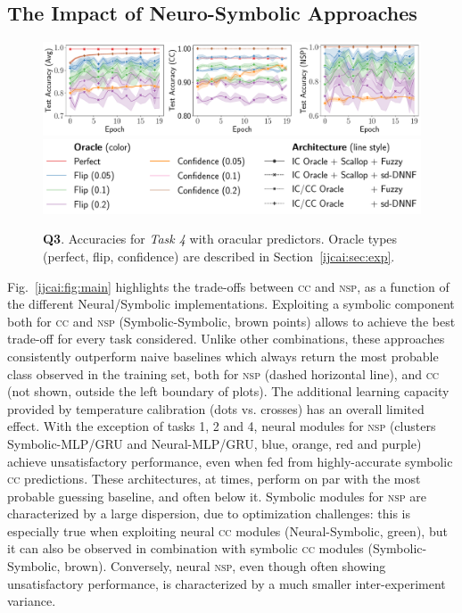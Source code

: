 \subsection{The Impact of Neuro-Symbolic Approaches}
\begin{figure}
\centering
\includegraphics[width=\linewidth]{imgs/ijcai/ablation_task4.pdf}\\
{\includegraphics[width=\linewidth]{imgs/ijcai/ablation_task4_legend.pdf}}
\caption[Oracle experiments on LTLZinc-Short (rejection sampling) Task 4]{\textbf{Q3}. Accuracies for \textit{Task 4} with oracular predictors. Oracle types (perfect, flip, confidence) are described in Section~\ref{ijcai:sec:exp}.}
\label{ijcai:fig:abl-task4}
\end{figure}
%
Fig.~\ref{ijcai:fig:main} highlights the trade-offs between \textsc{cc} and \textsc{nsp}, as a function of the different Neural/Symbolic implementations.
%
Exploiting a symbolic component both for \textsc{cc} and \textsc{nsp} (Symbolic-Symbolic, brown points) allows to achieve the best trade-off for every task considered. Unlike other combinations, these approaches consistently outperform naive baselines which always return the most probable class observed in the training set, both for \textsc{nsp} (dashed horizontal line), and \textsc{cc} (not shown, outside the left boundary of plots).
%
The additional learning capacity provided by temperature calibration (dots vs. crosses) has an overall limited effect.
%
With the exception of tasks 1, 2 and 4, neural modules for \textsc{nsp} (clusters Symbolic-MLP/GRU and Neural-MLP/GRU, blue, orange, red and purple) achieve unsatisfactory performance, even when fed from highly-accurate symbolic \textsc{cc} predictions. These architectures, at times, perform on par with the most probable guessing baseline, and often below it.
%
Symbolic modules for \textsc{nsp} are characterized by a large dispersion, due to optimization challenges: this is especially true when exploiting neural \textsc{cc} modules (Neural-Symbolic, green), but it can also be observed in combination with symbolic \textsc{cc} modules (Symbolic-Symbolic, brown). Conversely, neural \textsc{nsp}, even though often showing unsatisfactory performance, is characterized by a much smaller inter-experiment variance.

